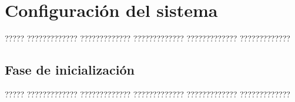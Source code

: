 \documentclass[11pt,spanish,listoffigures,listoftables]{tfgetsinf}
\begin{document}





\APPENDIX


\chapter{Configuración del sistema}

????? ????????????? ????????????? ????????????? ????????????? ?????????????

\section{Fase de inicialización}

????? ????????????? ????????????? ????????????? ????????????? ?????????????
\end{document}

